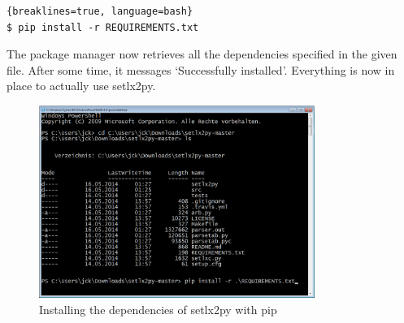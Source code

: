 \begin{lstlisting}{breaklines=true, language=bash}
$ pip install -r REQUIREMENTS.txt
\end{lstlisting}

The package manager now retrieves all the dependencies specified in the given file. After some time, it messages `Successfully installed'. Everything is now in place to actually use setlx2py.

\begin{figure}[ht]
    \centering
    \includegraphics[width=0.8\textwidth]{img/install-reqs.png}
    \caption{Installing the dependencies of setlx2py with pip}
    \label{fig:install-req}
\end{figure}

